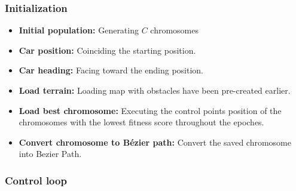     \subsubsection{Initialization}
    \begin{itemize}
      \item \textbf{Initial population:} Generating $C$ chromosomes 
      \item \textbf{Car position:} Coinciding the starting position.
      \item \textbf{Car heading:} Facing toward the ending position.
      \item \textbf{Load terrain:} Loading map with obstacles have been pre-created earlier.
      \item \textbf{Load best chromosome:} Executing the control points position of the chromosomes with the lowest fitness score throughout the epoches.
      \item \textbf{Convert chromosome to Bézier path:} Convert the saved chromosome into Bezier Path.
    \end{itemize}
    \subsubsection{Control loop}
